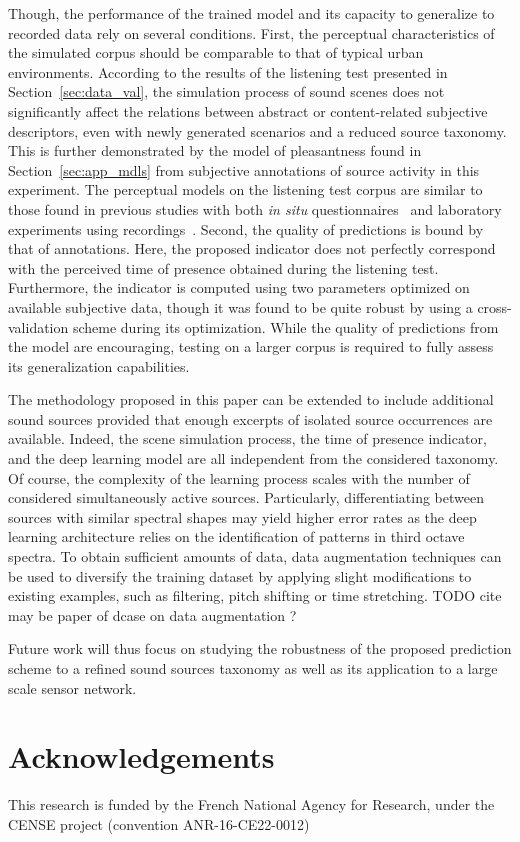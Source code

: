 \documentclass[twocolumn]{article}
\begin{document}
Though, the performance of the trained model and its capacity to generalize to recorded data rely on several conditions. First, the perceptual characteristics of the simulated corpus should be comparable to that of typical urban environments. According to the results of the listening test presented in Section~\ref{sec:data_val}, the simulation process of sound scenes does not significantly affect the relations between abstract or content-related subjective descriptors, even with newly generated scenarios and a reduced source taxonomy. This is further demonstrated by the model of pleasantness found in Section~\ref{sec:app_mdls} from subjective annotations of source activity in this experiment. The perceptual models on the listening test corpus are similar to those found in previous studies with both \textit{in situ} questionnaires~\cite{aumond2017} and laboratory experiments using recordings~\cite{ricciardi2014}. Second, the quality of predictions is bound by that of annotations. Here, the proposed indicator does not perfectly correspond with the perceived time of presence obtained during the listening test. Furthermore, the indicator is computed using two parameters optimized on available subjective data, though it was found to be quite robust by using a cross-validation scheme during its optimization. While the quality of predictions from the model are encouraging, testing on a larger corpus is required to fully assess its generalization capabilities.

The methodology proposed in this paper can be extended to include additional sound sources provided that enough excerpts of isolated source occurrences are available. Indeed, the scene simulation process, the time of presence indicator, and the deep learning model are all independent from the considered taxonomy. Of course, the complexity of the learning process scales with the number of considered simultaneously active sources. Particularly, differentiating between sources with similar spectral shapes may yield higher error rates as the deep learning architecture relies on the identification of patterns in third octave spectra. To obtain sufficient amounts of data, data augmentation techniques can be used to diversify the training dataset by applying slight modifications to existing examples, such as filtering, pitch shifting or time stretching. TODO cite may be paper of dcase on data augmentation ?

Future work will thus focus on studying the robustness of the proposed prediction scheme to a refined sound sources taxonomy as well as its application to a large scale sensor network.



\section*{Acknowledgements}
\label{sec:ack}

This research is funded by the French National Agency for Research, under the CENSE project (convention ANR-16-CE22-0012)




\end{document}
